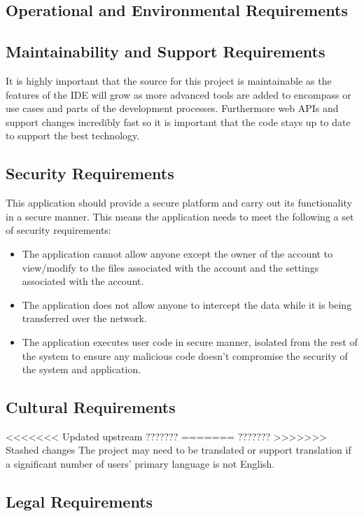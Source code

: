 \documentclass[12pt, titlepage]{article}
\begin{document}
  \subsection{Operational and Environmental Requirements}

  \subsection{Maintainability and Support Requirements}
  It is highly important that the source for this project is maintainable as 
  the features of the IDE will grow as more advanced tools are added to 
  encompass or use cases and parts of the development processes. Furthermore 
  web APIs and support changes incredibly fast so it is important that the code
   stays up to date to support the best technology.

  \subsection{Security Requirements}
  This application should provide a secure platform and carry out its
  functionality in a secure manner. This means the application needs to meet
  the following a set of security requirements:
  \begin{itemize}
    \item The application cannot allow anyone except the owner of the account
      to view/modify to the files associated with the account and the settings
      associated with the account.
    \item The application does not allow anyone to intercept the data while it
      is being transferred over the network.
    \item The application executes user code in secure manner, isolated from
      the rest of the system to ensure any malicious code doesn't compromise
      the security of the system and application.
  \end{itemize}

  \subsection{Cultural Requirements}
<<<<<<< Updated upstream
  {\huge ???????}
=======
  \Huge ???????
>>>>>>> Stashed changes
  The project may need to be translated or support translation if a significant
  number of users' primary language is not English.

  \subsection{Legal Requirements}
\end{document}

